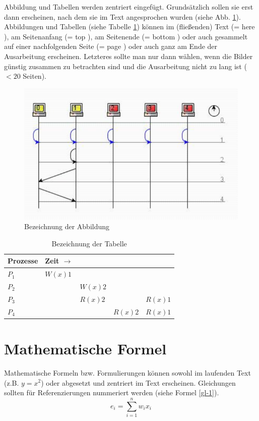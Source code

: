 Abbildung und Tabellen werden zentriert eingefügt. Grundsätzlich sollen sie
erst dann erscheinen, nach dem sie im Text angesprochen wurden (siehe Abb. \ref{a1}). Abbildungen und Tabellen (siehe Tabelle \ref{t1}) können
im (fließenden) Text (= here ), am Seitenanfang (= top ), am Seitenende
(= bottom ) oder auch gesammelt auf einer nachfolgenden Seite (= page )
oder auch ganz am Ende der Ausarbeitung erscheinen. Letzteres sollte man nur
dann wählen, wenn die Bilder günstig zusammen zu betrachten sind und die
Ausarbeitung nicht zu lang ist ($< 20$ Seiten).

\begin{figure} %
	\centering
		\includegraphics{images/p1ReadSeq.pdf}
	\caption{Bezeichnung der Abbildung}
	\label{a1}
\end{figure}

\begin{table} %
	\centering
		\begin{tabular}{l | l l l l}
		\textbf{Prozesse} & \textbf{Zeit} $\rightarrow$ \\
		\hline
			$P_{1}$ & $W(x)1$ \\
			$P_{2}$ & & $W(x)2$ \\
			$P_{3}$ & & $R(x)2$ & & $R(x)1$\\
			$P_{4}$ & & & $R(x)2$ & $R(x)1$\\
		\end{tabular}
	\caption{Bezeichnung der Tabelle}
	\label{t1}
\end{table}


\section{Mathematische Formel}
Mathematische Formeln bzw. Formulierungen können sowohl im
laufenden Text (z.B. $y=x^2$) oder abgesetzt und zentriert im Text
erscheinen. Gleichungen sollten für Referenzierungen nummeriert
werden (siehe Formel \ref{gl-1}).
\begin{equation}
\label{gl-1}
e_{i}=\sum _{i=1}^{n}w_{i}x_{i}
\end{equation}

